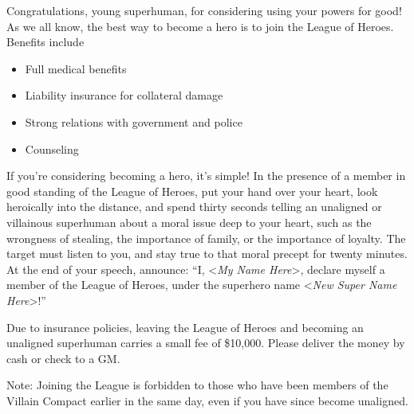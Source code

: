 \documentclass[white]{guildcamp1}
\begin{document}
\name{\wHeroRecruitment{}}

Congratulations, young superhuman, for considering using your powers for good!  As we all know, the best way to become a hero is to join the League of Heroes.  Benefits include

\begin{itemize}
\item Full medical benefits
\item Liability insurance for collateral damage
\item Strong relations with government and police
\item Counseling
\end{itemize}

If you're considering becoming a hero, it's simple!  In the presence of a member in good standing of the League of Heroes, put your hand over your heart, look heroically into the distance, and spend thirty seconds telling an unaligned or villainous superhuman about a moral issue deep to your heart, such as the wrongness of stealing, the importance of family, or the importance of loyalty.  The target must listen to you, and stay true to that moral precept for twenty minutes.  At the end of your speech, announce: ``I, <\textit{My Name Here}>, declare myself a member of the League of Heroes, under the superhero name <\textit{New Super Name Here}>!''

Due to insurance policies, leaving the League of Heroes and becoming an unaligned superhuman carries a small fee of \$10,000.  Please deliver the money by cash or check to a GM.

Note: Joining the League is forbidden to those who have been members of the Villain Compact earlier in the same day, even if you have since become unaligned.
\end{document}
